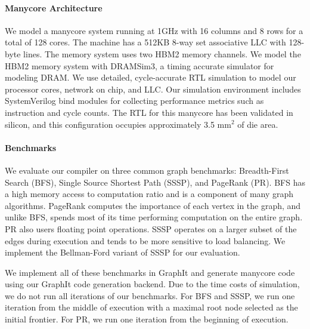\paragraph{Manycore Architecture}
We model a manycore system running at 1GHz with 16 columns and 8 rows for a total of 128 cores.
The machine has a 512KB 8-way set associative LLC with 128-byte lines.
The memory system uses two HBM2 memory channels.
We model the HBM2 memory system with DRAMSim3\cite{li2019dramsim3},  a timing accurate simulator for modeling DRAM.
We use detailed, cycle-accurate RTL simulation to model our processor cores, network on chip, and LLC.
Our simulation environment includes SystemVerilog bind modules for collecting performance metrics such as instruction and cycle counts.
The RTL for this manycore has been validated in silicon, and this configuration occupies approximately 3.5 mm$^2$ of die area. 

\tabHBParams

\paragraph{Benchmarks} We evaluate our compiler on three common graph benchmarks: Breadth-First Search (BFS), Single Source Shortest Path (SSSP), and PageRank (PR). 
BFS has a high memory access to computation ratio and is a component of many graph algorithms.
PageRank computes the importance of each vertex in the graph, and unlike BFS, spends most of its time performing computation on the entire graph.
PR also users floating point operations.
SSSP operates on a larger subset of the edges during execution and tends to be more sensitive to load balancing.
We implement the Bellman-Ford variant of SSSP for our evaluation.

We implement all of these benchmarks in GraphIt and generate manycore code using our GraphIt code generation backend.
Due to the time costs of simulation, we do not run all iterations of our benchmarks. 
For BFS and SSSP, we run one iteration from the middle of execution with a maximal root node selected as the initial frontier.
For PR, we run one iteration from the beginning of execution.



